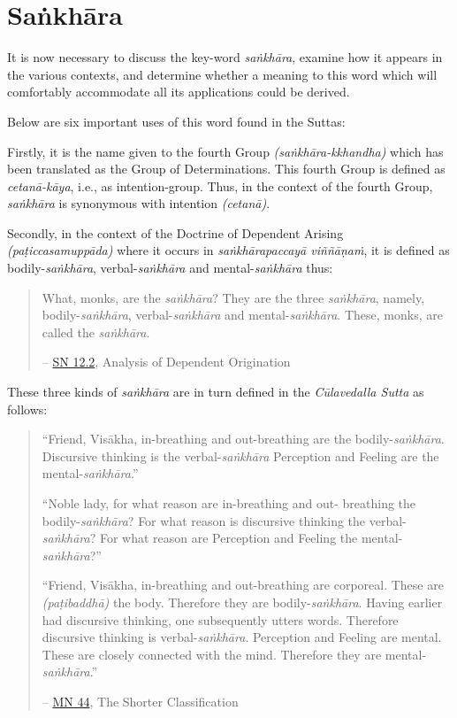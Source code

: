 \chapter{Saṅkhāra}

It is now necessary to discuss the key-word \emph{saṅkhāra}, examine how it appears in the various contexts, and determine whether a meaning to this word which will comfortably accommodate all its applications could be derived.

Below are six important uses of this word found in the Suttas:

Firstly, it is the name given to the fourth Group \emph{(saṅkhāra-kkhandha)} which has been translated as the Group of Determinations. This fourth Group is defined as \emph{cetanā-kāya}, i.e., as intention-group. Thus, in the context of the fourth Group, \emph{saṅkhāra} is synonymous with intention \emph{(cetanā)}.

Secondly, in the context of the Doctrine of Dependent Arising \emph{(paṭiccasamuppāda)} where it occurs in \emph{saṅkhārapaccayā viññāṇaṁ}, it is defined as bodily-\emph{saṅkhāra}, verbal-\emph{saṅkhāra} and mental-\emph{saṅkhāra} thus:

\begin{quote}
What, monks, are the \emph{saṅkhāra}? They are the three \emph{saṅkhāra}, namely, bodily-\emph{saṅkhāra}, verbal-\emph{saṅkhāra} and mental-\emph{saṅkhāra}. These, monks, are called the \emph{saṅkhāra}.

 -- \href{https://suttacentral.net/sn12.2/en/bodhi}{SN 12.2}, Analysis of Dependent Origination
\end{quote}

These three kinds of \emph{saṅkhāra} are in turn defined in the \emph{Cūlavedalla Sutta} as follows:

\begin{quote}
``Friend, Visākha, in-breathing and out-breathing are the bodily-\emph{saṅkhāra}. Discursive thinking is the verbal-\emph{saṅkhāra} Perception and Feeling are the mental-\emph{saṅkhāra}.''

``Noble lady, for what reason are in-breathing and out- breathing the bodily-\emph{saṅkhāra}? For what reason is discursive thinking the verbal-\emph{saṅkhāra}? For what reason are Perception and Feeling the mental-\emph{saṅkhāra}?''

``Friend, Visākha, in-breathing and out-breathing are corporeal. These are  \emph{(paṭibaddhā)} the body. Therefore they are bodily-\emph{saṅkhāra}. Having earlier had discursive thinking, one subsequently utters words. Therefore discursive thinking is verbal-\emph{saṅkhāra}. Perception and Feeling are mental. These are closely connected with the mind. Therefore they are mental-\emph{saṅkhāra}.''

 -- \href{https://suttacentral.net/mn44/en/sujato}{MN 44}, The Shorter Classification
\end{quote}

